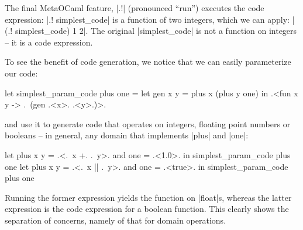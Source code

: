 \documentclass[draft]{elsart}
\begin{document}
The final MetaOCaml feature, |.!| (pronounced ``run'') 
executes the code expression: |.! simplest_code| is a function of two
integers, which we can apply: |(.! simplest_code) 1 2|. The original
|simplest_code| is not a function on integers -- it is a code
expression.

To see the benefit of code generation, we notice that we can easily
parameterize our code:

\begin{code}
let simplest_param_code plus one =
  let gen x y = plus x (plus y one) in
  .<fun x y -> .~(gen .<x>. .<y>.)>.
\end{code}
and use it to generate code that operates on integers, floating point
numbers or booleans -- in general, any domain that implements |plus|
and |one|:
\begin{code}
let plus x y = .<.~x +. .~y>. and one = .<1.0>. in
  simplest_param_code plus one
let plus x y = .<.~x || .~y>. and one = .<true>. in
  simplest_param_code plus one
\end{code}
Running the former expression yields the function on |float|s, whereas
the latter expression is the code expression for a boolean function.
This clearly shows the separation of concerns, namely of that for domain
operations.
\end{document}

